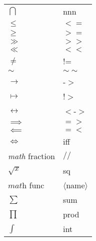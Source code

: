 \documentclass[10pt]{beamer}
\begin{document}

\begin{frame}

\begin{tabular}{ll}
$\bigcap$ & nnn \\
$\le$ & $<=$ \\
$\ge$ & $>=$ \\
$\gg$ & $>>$ \\
$\ll$ & $<<$ \\
$\neq$ & != \\
$\sim$ & $\sim\sim$ \\
$\to$ & -$>$ \\
$\mapsto$ & !$>$ \\
$\leftrightarrow$ & $<$-$>$ \\
$\implies$ & $=>$ \\
$\impliedby$ & $=<$ \\
$\iff$ & iff \\
\textit{math} fraction & $//$ \\
$\sqrt{x}$ & sq \\
$\textit{math}$ func & $\langle$name$\rangle$ \\
$\sum$ & sum \\
$\prod$ & prod \\
$\int$ & int
\end{tabular}

\end{frame}

\end{document}
